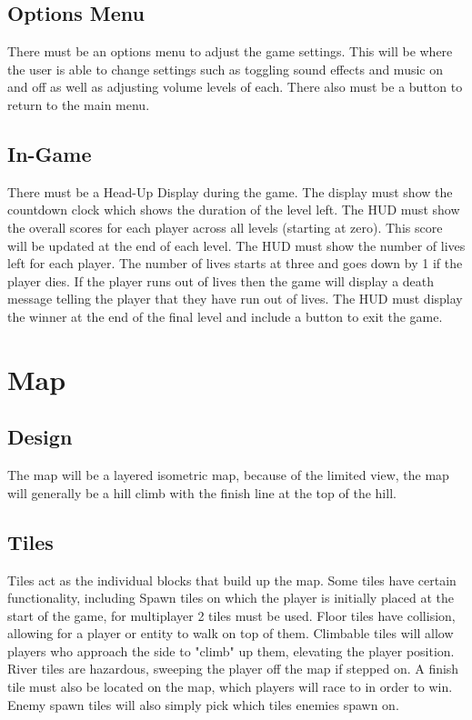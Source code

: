 \documentclass{scrreprt}
\begin{document}
\section{Options Menu}
There must be an options menu to adjust the game settings. This will be where the user is able to change settings such as toggling sound effects and music on and off as well as adjusting volume levels of each. There also must be a button to return to the main menu.

\section{In-Game}
There must be a Head-Up Display during the game. The display must show the countdown clock which shows the duration of the level left. The HUD must show the overall scores for each player across all levels (starting at zero). This score will be updated at the end of each level. The HUD must show the number of lives left for each player. The number of lives starts at three and goes down by 1 if the player dies. If the player runs out of lives then the game will display a death message telling the player that they have run out of lives. The HUD must display the winner at the end of the final level and include a button to exit the game. 

\chapter{Map}
\section{Design}
The map will be a layered isometric map, because of the limited view, the map will generally be a hill climb with the finish line at the top of the hill.

\section{Tiles}
Tiles act as the individual blocks that build up the map. Some tiles have certain functionality, including Spawn tiles on which the player is initially placed at the start of the game, for multiplayer 2 tiles must be used. Floor tiles have collision, allowing for a player or entity to walk on top of them. Climbable tiles will allow players who approach the side to "climb" up them, elevating the player position. River tiles are hazardous, sweeping the player off the map if stepped on. A finish tile must also be located on the map, which players will race to in order to win. Enemy spawn tiles will also simply pick which tiles enemies spawn on.
\end{document}
